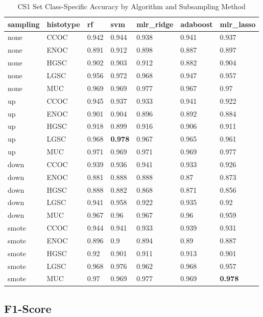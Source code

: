 \documentclass[
]{report}
\begin{document}
\begin{table}

\caption{\label{tab:cs1-accuracy-class-table}CS1 Set Class-Specific Accuracy by Algorithm and Subsampling Method}
\centering
\begin{tabular}[t]{l|l|l|l|l|l|l}
\hline
sampling & histotype & rf & svm & mlr\_ridge & adaboost & mlr\_lasso\\
\hline
none & CCOC & 0.942 & 0.944 & 0.938 & 0.941 & 0.937\\
\hline
none & ENOC & 0.891 & 0.912 & 0.898 & 0.887 & 0.897\\
\hline
none & HGSC & 0.902 & 0.903 & 0.912 & 0.882 & 0.904\\
\hline
none & LGSC & 0.956 & 0.972 & 0.968 & 0.947 & 0.957\\
\hline
none & MUC & 0.969 & 0.969 & 0.977 & 0.967 & 0.97\\
\hline
up & CCOC & 0.945 & 0.937 & 0.933 & 0.941 & 0.922\\
\hline
up & ENOC & 0.901 & 0.904 & 0.896 & 0.892 & 0.884\\
\hline
up & HGSC & 0.918 & 0.899 & 0.916 & 0.906 & 0.911\\
\hline
up & LGSC & 0.968 & \textbf{0.978} & 0.967 & 0.965 & 0.961\\
\hline
up & MUC & 0.971 & 0.969 & 0.971 & 0.969 & 0.977\\
\hline
down & CCOC & 0.939 & 0.936 & 0.941 & 0.933 & 0.926\\
\hline
down & ENOC & 0.881 & 0.888 & 0.888 & 0.87 & 0.873\\
\hline
down & HGSC & 0.888 & 0.882 & 0.868 & 0.871 & 0.856\\
\hline
down & LGSC & 0.941 & 0.958 & 0.922 & 0.935 & 0.92\\
\hline
down & MUC & 0.967 & 0.96 & 0.967 & 0.96 & 0.959\\
\hline
smote & CCOC & 0.944 & 0.941 & 0.933 & 0.939 & 0.931\\
\hline
smote & ENOC & 0.896 & 0.9 & 0.894 & 0.89 & 0.887\\
\hline
smote & HGSC & 0.92 & 0.901 & 0.911 & 0.913 & 0.901\\
\hline
smote & LGSC & 0.968 & 0.976 & 0.962 & 0.968 & 0.957\\
\hline
smote & MUC & 0.97 & 0.969 & 0.977 & 0.969 & \textbf{0.978}\\
\hline
\end{tabular}
\end{table}

\hypertarget{f1-score-2}{%
\subsection{F1-Score}\label{f1-score-2}}
\end{document}
